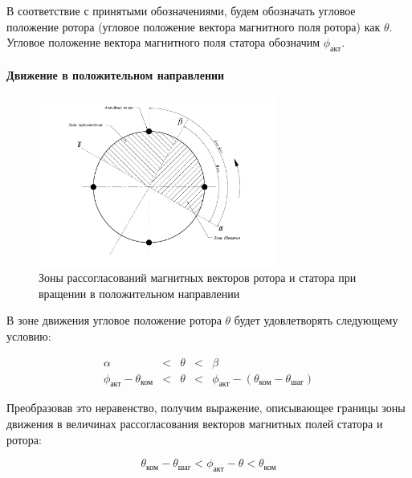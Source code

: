 В соответствие с принятыми обозначениями, будем обозначать угловое положение
ротора (угловое положение вектора магнитного поля ротора) как $\theta$.
Угловое положение вектора магнитного поля статора обозначим $\phi_\textit{акт}$.


\paragraph{Движение в положительном направлении}
\begin{figure}
    \centering
    \includegraphics[width=0.7\textwidth, keepaspectratio]
                    {./src/pictures/feedback_control/pole_switch_zones_with_positive_dir}
    \caption{Зоны рассогласований магнитных векторов ротора и статора при вращении в положительном направлении}
    \label{pole_switch_zones_with_positive_dir}
\end{figure}

В зоне движения угловое положение ротора $\theta$ будет удовлетворять следующему условию:

\begin{equation}
    \label{movement_zone_posit_move_for_curr_pos}
    \begin{array}{ccccc}
        \alpha & < & \theta & < & \beta                                         \\
        \phi_\textit{акт} - \theta_\textit{ком} & < & \theta
        & < &\phi_\textit{акт} - (\theta_\textit{ком} - \theta_\textit{шаг})
    \end{array}
\end{equation}

Преобразовав это неравенство, получим выражение, описывающее границы зоны движения
в величинах рассогласования векторов магнитных полей статора и ротора:

\begin{equation}
    \label{movement_zone_posit_move_for_delta}
    \theta_\textit{ком} - \theta_\textit{шаг} < \phi_\textit{акт} - \theta
    < \theta_\textit{ком}
\end{equation}


